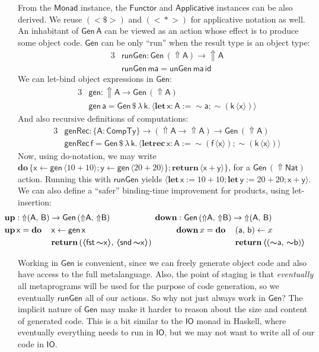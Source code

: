 \documentclass[acmsmall,screen,review,anonymous]{acmart}
\newcommand{\mit}[1]{{\mathsf{#1}}}
\newcommand{\msf}[1]{{\mathsf{#1}}}
\newcommand{\mbf}[1]{{\mathbf{#1}}}
\newcommand{\bs}[1]{\boldsymbol{#1}}
\newcommand{\mdo}{\mbf{do}\,}
\newcommand{\ind}{\hspace{1em}}
\newcommand{\return}{\mbf{return}\,}
\newcommand{\lam}{\lambda\,}
\newcommand{\letrec}{\mbf{letrec}\,}
\newcommand{\letdef}{\mbf{let\,}}
\newcommand{\vma}{\mathsf{ma}}
\newcommand{\vk}{\mathsf{k}}
\newcommand{\vA}{\mathsf{A}}
\newcommand{\vB}{\mathsf{B}}
\newcommand{\va}{\mathsf{a}}
\newcommand{\vb}{\mathsf{b}}
\newcommand{\vx}{\mathsf{x}}
\newcommand{\vy}{\mathsf{y}}
\newcommand{\vf}{\mathsf{f}}
\newcommand{\Monad}{\msf{Monad}}
\newcommand{\Applicative}{\msf{Applicative}}
\newcommand{\Functor}{\msf{Functor}}
\newcommand{\fro}{\leftarrow}
\newcommand{\Up}{{\Uparrow}}
\newcommand{\spl}{{\bs{\sim}}}
\newcommand{\ql}{{\bs{\langle}}}
\newcommand{\qr}{{\bs{\rangle}}}
\newcommand{\CTy}{\msf{CompTy}}
\newcommand{\fst}{\msf{fst}}
\newcommand{\snd}{\msf{snd}}
\newcommand{\Nat}{\msf{Nat}}
\theoremstyle{remark}
\newcommand{\id}{\mit{id}}
\newcommand{\mup}{\mbf{up}}
\newcommand{\mdown}{\mbf{down}}
\newcommand{\Gen}{\msf{Gen}}
\newcommand{\unGen}{\mit{unGen}}
\newcommand{\gen}{\mit{gen}}
\newcommand{\genRec}{\mit{genRec}}
\newcommand{\fmap}{<\!\!\$\!\!>}
\newcommand{\ap}{{<\!\!*\!\!>}}
\newcommand{\runGen}{\mit{runGen}}
\newcommand{\qt}[1]{\ql#1\qr}
\newcommand{\dlr}{\,\$\,}
\begin{document}
From the $\Monad$ instance, the $\Functor$ and $\Applicative$ instances can be
also derived. We reuse $({\fmap})$ and $({\ap})$ for applicative notation as well.
An inhabitant of $\Gen\,\vA$ can be viewed as an action whose effect is to produce
some object code. $\Gen$ can be only ``run'' when the result type is an object
type:
\begin{alignat*}{3}
  &\runGen : \Gen\,(\Up \vA) \to \Up \vA\\
  &\runGen\,\vma = \unGen\,\vma\,\id
\end{alignat*}
We can let-bind object expressions in $\Gen$:
\begin{alignat*}{3}
  & \gen : \Up \vA \to \Gen\,(\Up \vA) \\
  & \gen\,\va = \Gen \dlr \lam \vk.\,\ql \letdef \vx : \vA := \spl \va; \spl(\vk\,\ql \vx \qr) \qr
\end{alignat*}
And also recursive definitions of computations:
\begin{alignat*}{3}
  & \genRec : \{\vA : \CTy\} \to (\Up \vA \to \Up \vA) \to \Gen\,(\Up \vA) \\
  & \genRec\,\vf = \Gen \dlr \lam \vk.\,\qt{\letrec \vx : \vA := \spl(\vf\,\qt{\vx}); \spl(\vk\,\qt{\vx})}
\end{alignat*}
Now, using do-notation, we may write $\mdo \{\vx \fro \gen\,\qt{10 + 10}; \vy \fro
\gen\,\qt{20 + 20}\};\return \qt{\vx + \vy}\}$, for a $\Gen\,(\Up \Nat)$
action. Running this with $\runGen$ yields $\qt{\letdef \vx := 10 + 10; \letdef \vy
  := 20 + 20; \vx + \vy}$. We can also define a ``safer'' binding-time improvement for
products, using let-insertion:
\begin{alignat*}{6}
  &\hspace{-2em}\mathrlap{\mup : \Up (\vA,\,\vB) \to \Gen\,(\Up \vA,\,\Up \vB)            \hspace{5.45em} \mdown : \Gen\,(\Up \vA,\, \Up \vB) \to \Up(\vA,\,\vB)} \\
  &\hspace{-2em}\mup\,\vx = \mdo &&\vx \fro \gen\,\vx                                    && \ind\ind \mdown\,x = \mdo &&(\va,\,\vb) \fro x\\
  &\hspace{-2em}               &&\return (\qt{\fst\,\spl \vx},\,\qt{\snd\,\spl \vx})     &&                           &&\return \qt{(\spl \va,\, \spl \vb)}
\end{alignat*}

Working in $\Gen$ is convenient, since we can freely generate object code and
also have access to the full metalanguage. Also, the point of staging is that
\emph{eventually} all metaprograms will be used for the purpose of code
generation, so we eventually $\runGen$ all of our actions. So why not
just always work in $\Gen$? The implicit nature of $\Gen$ may make it harder to
reason about the size and content of generated code. This is a bit similar to
the $\msf{IO}$ monad in Haskell, where eventually everything needs to run in
$\msf{IO}$, but we may not want to write all of our code in $\msf{IO}$.
\end{document}
